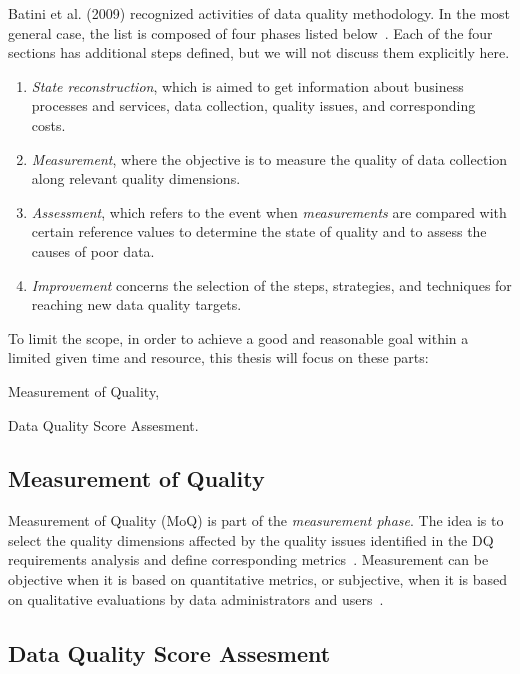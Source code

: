 Batini et al. (2009) recognized activities of data quality methodology.
In the most general case, the list is composed of four phases listed below~\cite{batini2009}.
Each of the four sections has additional steps defined, but we will not discuss them explicitly here.
\begin{enumerate}
    \item \textit{State reconstruction}, which is aimed to get information about business processes and services, data collection, quality issues, and corresponding costs.
    \item \textit{Measurement}, where the objective is to measure the quality of data collection along relevant quality dimensions.
    \item \textit{Assessment}, which refers to the event when \textit{measurements} are compared with certain reference values to determine the state of quality and to assess the causes of poor data.
    \item \textit{Improvement} concerns the selection of the steps, strategies, and techniques for reaching new data quality targets.
\end{enumerate}

To limit the scope, in order to achieve a good and reasonable goal within a limited given time and resource, this thesis will focus on these parts:
\begin{enumerate*}[label=(\roman*)]
    \item Measurement of Quality,
    \item Data Quality Score Assesment.
\end{enumerate*}

\subsection*{Measurement of Quality}

Measurement of Quality (MoQ) is part of the \textit{measurement phase}.
The idea is to select the quality dimensions affected by the quality issues identified in the DQ requirements analysis and define corresponding metrics~\cite{loshin2008}.
Measurement can be objective when it is based on quantitative metrics, or subjective, when it is based on qualitative evaluations by data administrators and users~\cite{loshin2008}.

\subsection*{Data Quality Score Assesment}

